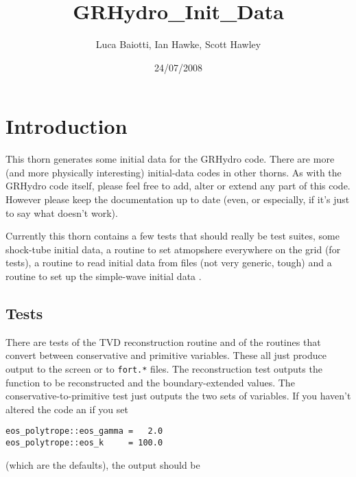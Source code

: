 \documentclass{article}
\begin{document}
\title{GRHydro\_Init\_Data}
\author{Luca Baiotti, Ian Hawke, Scott Hawley}
\date{24/07/2008}
\maketitle



\section{Introduction}
\label{sec:intro}

This thorn generates some initial data for the GRHydro code. There are more (and more physically
interesting) initial-data codes in other thorns. As with the GRHydro code itself, please feel free to
add, alter or extend any part of this code. However please keep the documentation up to date (even,
or especially, if it's just to say what doesn't work).

Currently this thorn contains a few tests that should really be test suites, some shock-tube
initial data, 
a routine to set atmopshere everywhere on the
grid (for tests), a routine to read initial data from files (not very generic, tough) and a routine
to set up the simple-wave initial data .


\subsection{Tests}
\label{sec:tests}

There are tests of the TVD reconstruction routine and of the routines
that convert between conservative and primitive variables. These all
just produce output to the screen or to {\tt fort.*} files. The
reconstruction test outputs the function to be reconstructed and the
boundary-extended values. The conservative-to-primitive test just
outputs the two sets of variables. If you haven't altered the code an if you set
\begin{verbatim}
eos_polytrope::eos_gamma =   2.0
eos_polytrope::eos_k     = 100.0
\end{verbatim}
(which are the defaults), the output should be
\end{document}
